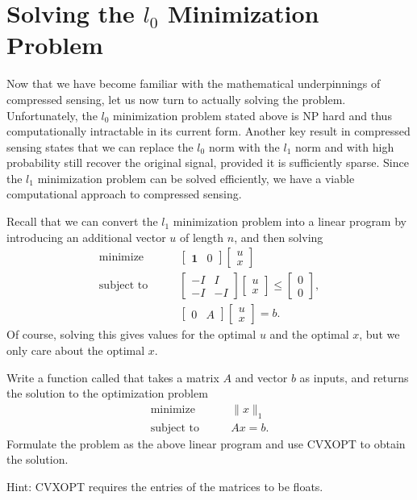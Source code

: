 \section*{Solving the $l_0$ Minimization Problem}
Now that we have become familiar with the mathematical underpinnings of compressed sensing, let us now turn to 
actually solving the problem. Unfortunately, the $l_0$ minimization problem stated above is NP hard and thus 
computationally intractable in its current form. Another key result in compressed sensing states that we can
replace the $l_0$ norm with the $l_1$ norm and with high probability still recover the original signal, provided
it is sufficiently sparse. Since the $l_1$ minimization problem can be solved efficiently, we have a viable 
computational approach to compressed sensing. 

Recall that we can convert the $l_1$ minimization problem into a linear program by introducing an additional
vector $u$ of length $n$, and then solving
\begin{align*}
\text{minimize}\qquad 
&\begin{bmatrix}
\mathbf{1} & 0
\end{bmatrix}
\begin{bmatrix}
u \\
x
\end{bmatrix}\\
\text{subject to}\qquad
&\begin{bmatrix}
-I & I\\
-I & -I
\end{bmatrix}
\begin{bmatrix}
u \\
x
\end{bmatrix}
\leq 
\begin{bmatrix}
0\\
0
\end{bmatrix},\\
&\begin{bmatrix}
0 & A
\end{bmatrix}
\begin{bmatrix}
u \\
x
\end{bmatrix}
= 
b.
\end{align*}
Of course, solving this gives values for the optimal $u$ and the optimal $x$, but we only care about the optimal $x$.

\begin{problem}
Write a function called  that takes a matrix $A$ and vector $b$ as inputs, and returns the solution to the optimization problem 
\begin{align*}
\text{minimize}\qquad &\|x\|_1\\
\text{subject to} \qquad &Ax = b.
\end{align*}
Formulate the problem as the above linear program and use CVXOPT to obtain the solution.

Hint: CVXOPT requires the entries of the matrices to be floats.
\end{problem}

